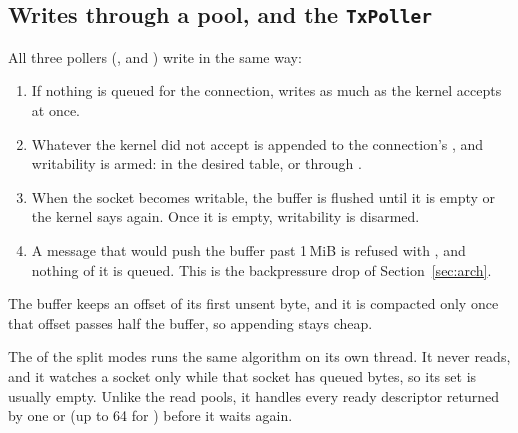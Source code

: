 \subsection{Writes through a pool, and the \texttt{TxPoller}}

All three pollers (,  and
) write in the same way:
\begin{enumerate}
  \item If nothing is queued for the connection, 
        writes as much as the kernel accepts at once.
  \item Whatever the kernel did not accept is appended to the connection's
        , and writability is armed:  in the desired
        table, or  through .
  \item When the socket becomes writable, the buffer is flushed until it is empty
        or the kernel says  again. Once it is empty, writability is
        disarmed.
  \item A message that would push the buffer past 1\,MiB is refused with
        , and nothing of it is queued. This is the backpressure drop
        of Section~\ref{sec:arch}.
\end{enumerate}
The buffer keeps an offset of its first unsent byte, and it is compacted only once
that offset passes half the buffer, so appending stays cheap.

The  of the split modes runs the same algorithm on its own thread. It
never reads, and it watches a socket only while that socket has queued bytes, so its
set is usually empty. Unlike the read pools, it handles every ready descriptor
returned by one  or  (up to 64 for ) before
it waits again.

